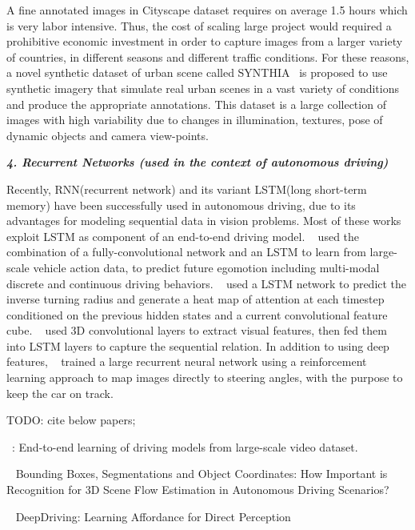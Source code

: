 \documentclass[10pt,twocolumn,letterpaper]{article}
\begin{document}
A fine annotated images in Cityscape dataset requires on average 1.5 hours which is very labor intensive. Thus, the cost of scaling large project would required a prohibitive economic investment in order to capture images from a larger variety of countries, in different seasons and different traffic conditions. For these reasons, a novel synthetic dataset of urban scene called SYNTHIA~\cite{ros2016synthia} is proposed to use synthetic imagery that simulate real urban scenes in a vast variety of conditions and produce the appropriate annotations.
This dataset is a large collection of images with high variability due to changes in illumination, textures, pose of dynamic objects and camera view-points.



\textbf{\emph{4. Recurrent Networks (used in the context of autonomous driving)}}


Recently, RNN(recurrent network) and its variant LSTM(long short-term memory) have been successfully used in autonomous driving, due to its advantages for modeling sequential data in vision problems. Most of these works exploit LSTM as component of an end-to-end driving model. ~\cite{xu2017end} used the combination of a fully-convolutional network and an LSTM to learn from large-scale vehicle action data, to predict future egomotion including multi-modal discrete and continuous driving behaviors. ~\cite{kim2017interpretable} used a LSTM network to predict the inverse turning radius and generate a heat map of attention at each timestep conditioned on the previous hidden states and a current convolutional feature cube. ~\cite{duself} used 3D convolutional layers to extract visual features, then fed them into LSTM layers to capture the sequential relation. In addition to using deep features, ~\cite{koutnik2013evolving} trained a large recurrent neural network using a reinforcement learning approach to map images directly to steering angles, with the purpose to keep the car on track.

TODO: cite below papers;

~\cite{xu2017end}: End-to-end learning of driving models from large-scale video dataset.

~\cite{behl2017bounding} Bounding Boxes, Segmentations and Object Coordinates: How Important is Recognition for 3D Scene Flow Estimation in Autonomous Driving Scenarios?

~\cite{chen2015deepdriving} DeepDriving: Learning Affordance for Direct Perception
\end{document}
